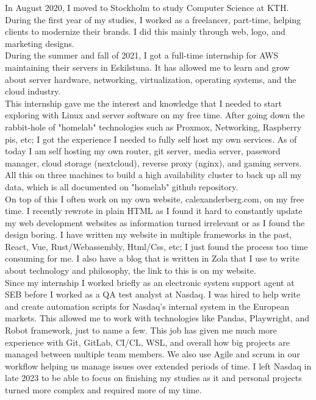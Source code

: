 \documentclass[../main.tex]{subfiles}
\begin{document}
\par
In August 2020, I moved to Stockholm to study Computer Science at KTH. During the first year of my studies, I worked as a freelancer, part-time, helping clients to modernize their brands. I did this mainly through web, logo, and marketing designs.
\\

During the summer and fall of 2021, I got a full-time internship for AWS maintaining their servers in Eskilstuna. It has allowed me to learn and grow about server hardware, networking, virtualization, operating systems, and the cloud industry.
\\

This internship gave me the interest and knowledge that I needed to start exploring with Linux and server software on my free time. After going down the rabbit-hole of "homelab" technologies such as Proxmox, Networking, Raspberry pis, etc; I got the experience I needed to fully self host my own services. As of today I am self hosting my own router, git server, media server, password manager, cloud storage (nextcloud), reverse proxy (nginx), and gaming servers. All this on three machines to build a high availability cluster to back up all my data, which is all documented on "homelab" github repository.
\\

On top of this I often work on my own website, calexanderberg.com, on my free time. I recently rewrote in plain HTML as I found it hard to constantly update my web development websites as information turned irrelevant or as I found the design boring. I have written my website in multiple frameworks in the past, React, Vue, Rust/Webassembly, Html/Css, etc; I just found the process too time consuming for me. I also have a blog that is written in Zola that I use to write about technology and philosophy, the link to this is on my website.
\\

Since my internship I worked briefly as an electronic system support agent at SEB before I worked as a QA test analyst at Nasdaq. I was hired to help write and create automation scripts for Nasdaq's internal system in the European markets. This allowed me to work with technologies like Pandas, Playwright, and Robot framework, just to name a few. This job has given me much more experience with Git, GitLab, CI/CL, WSL, and overall how big projects are managed between multiple team members. We also use Agile and scrum in our workflow helping us manage issues over extended periods of time. I left Nasdaq in late 2023 to be able to focus on finishing my studies as it and personal projects turned more complex and required more of my time.
\\
\end{document}
